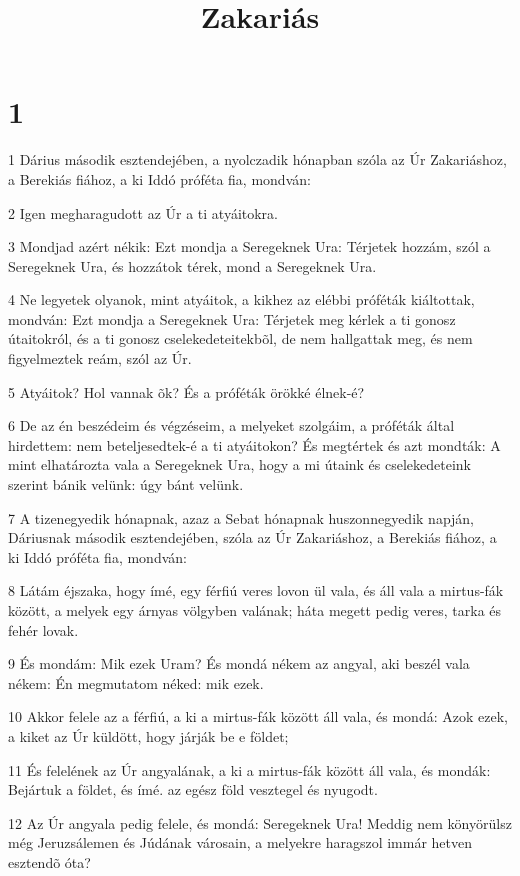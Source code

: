 

\title{Zakariás}


\chapter{1}

\par 1 Dárius második esztendejében, a nyolczadik hónapban szóla az Úr Zakariáshoz, a Berekiás fiához, a ki Iddó próféta fia, mondván:
\par 2 Igen megharagudott az Úr a ti atyáitokra.
\par 3 Mondjad azért nékik: Ezt mondja a Seregeknek Ura: Térjetek hozzám, szól a Seregeknek Ura, és hozzátok térek, mond a Seregeknek Ura.
\par 4 Ne legyetek olyanok, mint atyáitok, a kikhez az elébbi próféták kiáltottak, mondván: Ezt mondja a Seregeknek Ura: Térjetek meg kérlek a ti gonosz útaitokról, és a ti gonosz cselekedeteitekbõl, de nem hallgattak meg, és nem figyelmeztek reám, szól az Úr.
\par 5 Atyáitok? Hol vannak õk? És a próféták örökké élnek-é?
\par 6 De az én beszédeim és végzéseim, a melyeket szolgáim, a próféták által hirdettem: nem beteljesedtek-é a ti atyáitokon? És megtértek és azt mondták: A mint elhatározta vala a Seregeknek Ura, hogy a mi útaink és cselekedeteink szerint bánik velünk: úgy bánt velünk.
\par 7 A tizenegyedik hónapnak, azaz a Sebat hónapnak huszonnegyedik napján, Dáriusnak második esztendejében, szóla az Úr Zakariáshoz, a Berekiás fiához, a ki Iddó próféta fia, mondván:
\par 8 Látám éjszaka, hogy ímé, egy férfiú veres lovon ül vala, és áll vala a mirtus-fák között, a melyek egy árnyas völgyben valának; háta megett pedig veres, tarka és fehér lovak.
\par 9 És mondám: Mik ezek Uram? És mondá nékem az angyal, aki beszél vala nékem: Én megmutatom néked: mik ezek.
\par 10 Akkor felele az a férfiú, a ki a mirtus-fák között áll vala, és mondá: Azok ezek, a kiket az Úr küldött, hogy járják be e földet;
\par 11 És felelének az Úr angyalának, a ki a mirtus-fák között áll vala, és mondák: Bejártuk a földet, és ímé. az egész föld vesztegel és nyugodt.
\par 12 Az Úr angyala pedig felele, és mondá: Seregeknek Ura! Meddig nem könyörülsz még Jeruzsálemen és Júdának városain, a melyekre haragszol immár hetven esztendõ óta?
